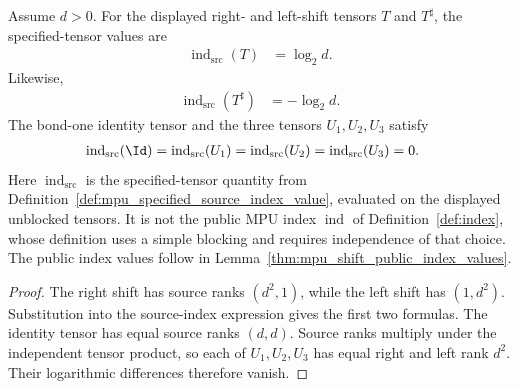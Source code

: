 \begin{lemma}
    \label{thm:mpu_shift_specified_source_index_values}
    \leanok
    Assume $d>0$. For the displayed right- and left-shift tensors $T$ and
    $T^\sharp$, the specified-tensor values are
    \begin{align}
        \operatorname{ind}_{\mathrm{src}}(T) & =\log_2 d.
    \end{align}
    Likewise,
    \begin{align}
        \operatorname{ind}_{\mathrm{src}}(T^\sharp) & =-\log_2 d.
    \end{align}
    The bond-one identity tensor and the three tensors $U_1,U_2,U_3$ satisfy
    \begin{align}
        \operatorname{ind}_{\mathrm{src}}(\Id)
        =\operatorname{ind}_{\mathrm{src}}(U_1)
        =\operatorname{ind}_{\mathrm{src}}(U_2)
        =\operatorname{ind}_{\mathrm{src}}(U_3) & =0.
    \end{align}
    Here $\operatorname{ind}_{\mathrm{src}}$ is the specified-tensor quantity
    from Definition~\ref{def:mpu_specified_source_index_value}, evaluated on the
    displayed unblocked tensors. It is not the public MPU index
    $\operatorname{ind}$ of Definition~\ref{def:index}, whose definition uses a
    simple blocking and requires independence of that choice.
    The public index values follow in
    Lemma~\ref{thm:mpu_shift_public_index_values}.
\end{lemma}

\begin{proof}\leanok
    The right shift has source ranks $(d^2,1)$, while the left shift has
    $(1,d^2)$. Substitution into the source-index expression gives the first
    two formulas. The identity tensor has equal source ranks $(d,d)$. Source
    ranks multiply under the independent tensor product, so each of
    $U_1,U_2,U_3$ has equal right and left rank $d^2$. Their logarithmic
    differences therefore vanish.
\end{proof}

